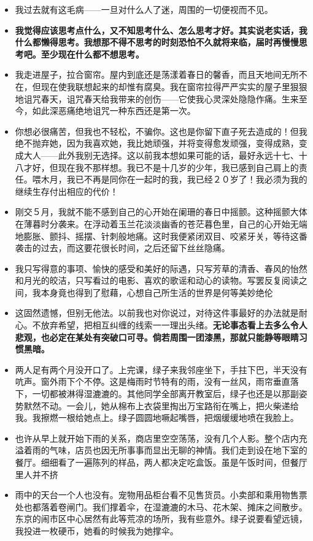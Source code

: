 \documentclass[UTF8,a4paper,8pt]{ctexbook}
\begin{document}
\begin{itemize}
		\item 我过去就有这毛病——一旦对什么人了迷，周围的一切便视而不见。
		\item \textbf{我觉得应该思考点什么，又不知思考什么、怎么思考才好。其实说老实话，我什么都懒得思考。我想那不得不思考的时刻恐怕不久就将来临，届时再慢慢思考吧。至少现在什么都不想思考。}
		\item 我走进屋子，拉合窗帘。屋内到底还是荡漾着春日的馨香，而且天地间无所不在，但现在使我联想起来的却惟有腐臭。我在窗帘拉得严严实实的屋子里狠狠地诅咒春天，诅咒春天给我带来的创伤——它使我心灵深处隐隐作痛。生来至今，如此深恶痛绝地诅咒一种东西还是第一次。
		\item 你想必很痛苦，但我也不轻松，不骗你。这也是你留下直子死去造成的！但我绝不抛弃她，因为我喜欢她，我比她顽强，并将变得愈发顽强，变得成熟，变成大人——此外我别无选择。这以前我本想如果可能的话，最好永远十七、十八才好，但现在我不那样想。我已不是十几岁的少年，我已感到自己肩上的责任。喂木月，我已不再是同你在一起时的我，我已经２０岁了！我必须为我的继续生存付出相应的代价！
		\item 刚交５月，我就不能不感到自己的心开始在阑珊的春日中摇颤。这种摇颤大体在薄暮时分袭来。在浮动着玉兰花淡淡幽香的苍茫暮色里，自己的心开始无端地膨胀、颤抖、摇摆、针刺般地痛。这时我便紧闭双目、咬紧牙关，等待这番袭击的过去，而这要花很长时间，之后还留下丝丝隐痛。
		\item 我只写得意的事项、愉快的感受和美好的际遇，只写芳草的清香、春风的怡然和月光的皎洁，只写看过的电影、喜欢的歌谣和动心的读物。写罢反复阅读之间，我本身竟也得到了慰藉，心想自己所生活的世界是何等美妙绝伦
		\item 这固然遗憾，但别无他法。以前我也对你说过，对待这件事最好的办法就是耐心。不放弃希望，把相互纠缠的线索一一理出头绪。\textbf{无论事态看上去多么令人悲观，也必定在某处有突破口可寻。倘若周围一团漆黑，那就只能静等眼睛习惯黑暗。}
		\item 两人足有两个月没开口了。上完课，绿子来我邻座坐下，手拄下巴，半天没有吭声。窗外雨下个不停。这是梅雨时节特有的雨，没有一丝风，雨帘垂直落下，一切都被淋得湿漉漉的。其他同学全部离开教室后，绿子也还是以那副姿势默然不动。一会儿，她从棉布上衣袋里掏出万宝路衔在嘴上，把火柴递给我。我擦燃一根给她点上。绿子圆圆地噘起嘴唇，把烟缓缓地喷在我脸上。
		\item 也许从早上就开始下雨的关系，商店里空空荡荡，没有几个人影。整个店内充溢着雨的气味，店员也因无所事事而显出无聊的神情。我们走到设在地下室的餐厅。细细看了一遍陈列的样品，两人都决定吃盒饭。虽是午饭时间，但餐厅里人并不挤
		\item 雨中的天台一个人也没有。宠物用品柜台看不见售货员。小卖部和乘用物售票处也都落着卷闸门。我们撑着伞，在湿漉漉的木马、花木架、摊床之间散步。东京的闹市区中心居然有此等荒凉的场所，我有些意外。绿子说要看望远镜，我投进一枚硬币，她看的时候我为她撑伞。

\end{itemize}
\end{document}

